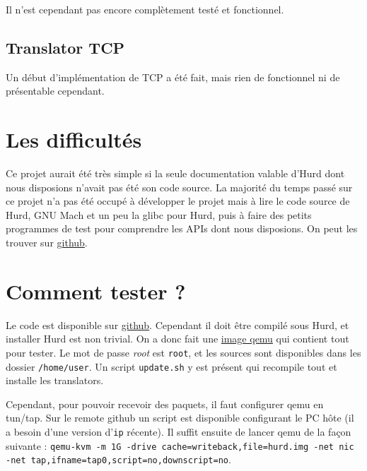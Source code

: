 \documentclass{article}
\begin{document}
Il n'est cependant pas encore complètement testé et fonctionnel.

\subsection{Translator TCP}
Un début d'implémentation de TCP a été fait, mais rien de fonctionnel ni de
présentable cependant.

\section{Les difficultés}
Ce projet aurait été très simple si la seule documentation valable d'Hurd dont
nous disposions n'avait pas été son code source. La majorité du temps passé sur
ce projet n'a pas été occupé à développer le projet mais à lire le code source
de Hurd, GNU Mach et un peu la glibc pour Hurd, puis à faire des petits programmes
de test pour comprendre les APIs dont nous disposions. On peut les trouver sur
\href{https://github.com/lucas8/ipc-mach}{github}.

\section{Comment tester ?}
Le code est disponible sur \href{https://github.com/lucas8/ENS_sysres}{github}.
Cependant il doit être compilé sous Hurd, et installer Hurd est non trivial.
On a donc fait une \href{https://download.dwarfmaster.net/hurd.img.xz}{image
qemu} qui contient tout pour tester. Le mot de passe \emph{root} est
\texttt{root}, et les sources sont disponibles dans les dossier
\texttt{/home/user}. Un script \texttt{update.sh} y est présent qui recompile
tout et installe les translators.

Cependant, pour pouvoir recevoir des paquets, il faut configurer qemu en tun/tap.
Sur le remote github un script est disponible configurant le PC hôte (il a besoin
d'une version d'\texttt{ip} récente). Il suffit ensuite de lancer qemu de la façon
suivante : \texttt{qemu-kvm -m 1G -drive cache=writeback,file=hurd.img -net nic
-net tap,ifname=tap0,script=no,downscript=no}.
\end{document}
